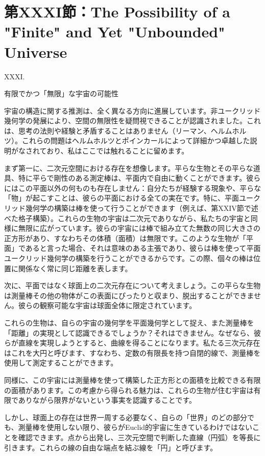 \documentclass[a4paper,11pt,openany]{ltjsbook}
\begin{document}
\clearpage
\chapter{第XXXI節：The Possibility of a "Finite" and Yet "Unbounded" Universe}

XXXI.

有限でかつ「無限」な宇宙の可能性

宇宙の構造に関する推測は、全く異なる方向に進展しています。非ユークリッド幾何学の発展により、空間の無限性を疑問視できることが認識されました。これは、思考の法則や経験と矛盾することはありません（リーマン、ヘルムホルツ）。これらの問題はヘルムホルツとポインカールによって詳細かつ卓越した説明がなされており、私はここでは触れることに留めます。

まず第一に、二次元空間における存在を想像します。平らな生物とその平らな道具、特に平らで剛性のある測定棒は、平面内で自由に動くことができます。彼らにはこの平面以外の何ものも存在しません：自分たちが経験する現象や、平らな「物」が起こすことは、彼らの平面における全ての実在です。特に、平面ユークリッド幾何学の構築は棒を使って行うことができます（例えば、第XXIV節で述べた格子構築）。これらの生物の宇宙は二次元でありながら、私たちの宇宙と同様に無限に広がっています。彼らの宇宙には棒で組み立てた無数の同じ大きさの正方形があり、すなわちその体積（面積）は無限です。このような生物が「平面」であると言った場合、それは意味のある主張であり、彼らは棒を使って平面ユークリッド幾何学の構築を行うことができるからです。この際、個々の棒は位置に関係なく常に同じ距離を表します。

次に、平面ではなく球面上の二次元存在について考えましょう。この平らな生物は測量棒その他の物体がこの表面にぴったりと収まり、脱出することができません。彼らの観察可能な宇宙は球面全体に限定されています。

これらの生物は、自らの宇宙の幾何学を平面幾何学として捉え、また測量棒を「距離」の実現として認識できるでしょうか？それはできません。なぜなら、彼らが直線を実現しようとすると、曲線を得ることになります。私たる三次元存在はこれを大円と呼びます、すなわち、定数の有限長を持つ自閉的線で、測量棒を使用して測定することができます。

同様に、この宇宙には測量棒を使って構築した正方形との面積を比較できる有限の面積があります。この考慮から得られる魅力は、これらの生物が住む宇宙は有限でありながら限界がないという事実を認識することです。

しかし、球面上の存在は世界一周する必要なく、自らの「世界」のどの部分でも、測量棒を使用しない限り、彼らがEuclid的宇宙に生きているわけではないことを確認できます。点から出発し、三次元空間で判断した直線（円弧）を等長に引きます。これらの線の自由な端点を結ぶ線を「円」と呼びます。
\end{document}
